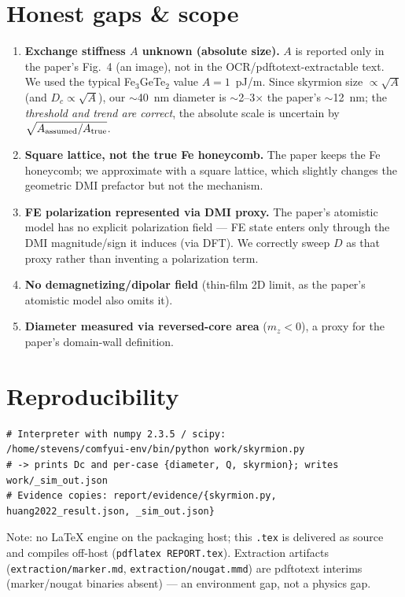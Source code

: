 \documentclass[11pt]{article}
\begin{document}
\section{Honest gaps \& scope}
\begin{enumerate}
\item \textbf{Exchange stiffness $A$ unknown (absolute size).} $A$ is reported
only in the paper's Fig.~4 (an image), not in the OCR/pdftotext-extractable
text. We used the typical Fe$_3$GeTe$_2$ value $A=1$~pJ/m. Since skyrmion size
$\propto\sqrt{A}$ (and $D_c\propto\sqrt{A}$), our $\sim$40~nm diameter is
$\sim$2--3$\times$ the paper's $\sim$12~nm; the \emph{threshold and trend are
correct}, the absolute scale is uncertain by $\sqrt{A_{\rm assumed}/A_{\rm true}}$.
\item \textbf{Square lattice, not the true Fe honeycomb.} The paper keeps the Fe
honeycomb; we approximate with a square lattice, which slightly changes the
geometric DMI prefactor but not the mechanism.
\item \textbf{FE polarization represented via DMI proxy.} The paper's atomistic
model has no explicit polarization field --- FE state enters only through the
DMI magnitude/sign it induces (via DFT). We correctly sweep $D$ as that proxy
rather than inventing a polarization term.
\item \textbf{No demagnetizing/dipolar field} (thin-film 2D limit, as the
paper's atomistic model also omits it).
\item \textbf{Diameter measured via reversed-core area} ($m_z<0$), a proxy for
the paper's domain-wall definition.
\end{enumerate}

\section{Reproducibility}
\begin{verbatim}
# Interpreter with numpy 2.3.5 / scipy:
/home/stevens/comfyui-env/bin/python work/skyrmion.py
# -> prints Dc and per-case {diameter, Q, skyrmion}; writes work/_sim_out.json
# Evidence copies: report/evidence/{skyrmion.py, huang2022_result.json, _sim_out.json}
\end{verbatim}
Note: no LaTeX engine on the packaging host; this \texttt{.tex} is delivered as
source and compiles off-host (\texttt{pdflatex REPORT.tex}). Extraction artifacts
(\texttt{extraction/marker.md}, \texttt{extraction/nougat.mmd}) are pdftotext
interims (marker/nougat binaries absent) --- an environment gap, not a physics gap.
\end{document}
